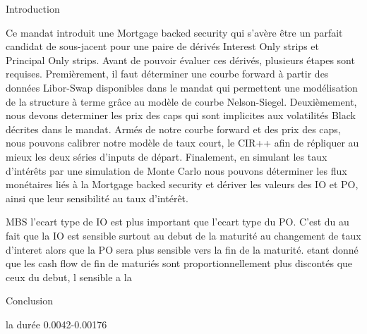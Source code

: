 Introduction

Ce mandat introduit une Mortgage backed security qui s'avère être un parfait
candidat de sous-jacent pour une paire de dérivés Interest Only strips et Principal
Only strips. Avant de pouvoir évaluer ces dérivés, plusieurs étapes sont
requises. Premièrement, il faut déterminer une courbe forward à partir des
données Libor-Swap disponibles dans le mandat qui permettent une modélisation de la
structure à terme grâce au modèle de courbe Nelson-Siegel. Deuxièmement, nous
devons determiner les prix des caps qui sont implicites aux volatilités Black
décrites dans le mandat. Armés de notre courbe forward et des prix des caps, nous
pouvons calibrer notre modèle de taux court, le CIR++ afin de répliquer au mieux les
deux séries d'inputs de départ. Finalement, en simulant les taux d'intérêts
par une simulation de Monte Carlo nous pouvons déterminer les flux monétaires
liés à la Mortgage backed security et dériver les valeurs des IO et PO, ainsi que
leur sensibilité au taux d'intérêt.



MBS
l'ecart type de IO est plus important que l'ecart type du PO. C'est du au fait que la IO est sensible surtout au debut de la maturité au changement de taux d'interet alors que la PO sera plus sensible vers la fin de la maturité. etant donné que les cash flow de fin de maturiés sont proportionnellement plus discontés que ceux du debut, l sensible a la 


Conclusion



la durée
0.0042-0.00176

